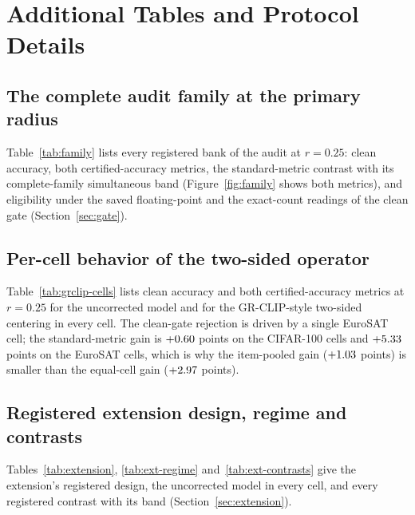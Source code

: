 \section{Additional Tables and Protocol Details}
\label{app:tables}

\subsection{The complete audit family at the primary radius}



Table~\ref{tab:family} lists every registered bank of the audit at $r=0.25$:
clean accuracy, both certified-accuracy metrics, the standard-metric contrast
with its complete-family simultaneous band (Figure~\ref{fig:family} shows both
metrics), and eligibility under the saved floating-point and the exact-count
readings of the clean gate (Section~\ref{sec:gate}).

\subsection{Per-cell behavior of the two-sided operator}



Table~\ref{tab:grclip-cells} lists clean accuracy and both certified-accuracy
metrics at $r=0.25$ for the uncorrected model and for the GR-CLIP-style
two-sided centering in every cell. The clean-gate rejection is driven by a
single EuroSAT cell; the standard-metric gain is $+0.60$ points on
the CIFAR-100 cells and $+5.33$ points on the EuroSAT cells, which
is why the item-pooled gain ($+1.03$ points) is smaller than the
equal-cell gain ($+2.97$ points).

\subsection{Registered extension design, regime and contrasts}

Tables~\ref{tab:extension}, \ref{tab:ext-regime} and~\ref{tab:ext-contrasts}
give the extension's registered design, the uncorrected model in every cell,
and every registered contrast with its band (Section~\ref{sec:extension}).





